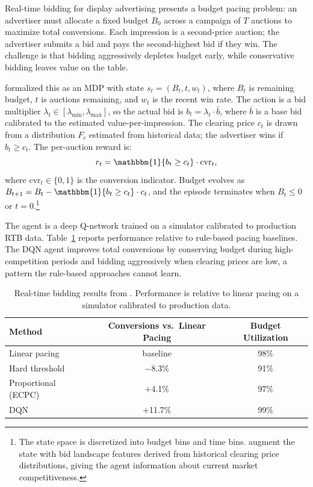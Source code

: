 Real-time bidding for display advertising presents a budget pacing problem: an advertiser must allocate a fixed budget $B_0$ across a campaign of $T$ auctions to maximize total conversions. Each impression is a second-price auction; the advertiser submits a bid and pays the second-highest bid if they win. The challenge is that bidding aggressively depletes budget early, while conservative bidding leaves value on the table.

\citet{Wu2018rtb} formalized this as an MDP with state $s_t = (B_t, t, w_t)$, where $B_t$ is remaining budget, $t$ is auctions remaining, and $w_t$ is the recent win rate. The action is a bid multiplier $\lambda_t \in [\lambda_{\min}, \lambda_{\max}]$, so the actual bid is $b_t = \lambda_t \cdot \bar{b}$, where $\bar{b}$ is a base bid calibrated to the estimated value-per-impression. The clearing price $c_t$ is drawn from a distribution $F_c$ estimated from historical data; the advertiser wins if $b_t \geq c_t$. The per-auction reward is:
\begin{equation}
r_t = \mathbbm{1}\{b_t \geq c_t\} \cdot \mathrm{cvr}_t,
\end{equation}
where $\mathrm{cvr}_t \in \{0,1\}$ is the conversion indicator. Budget evolves as $B_{t+1} = B_t - \mathbbm{1}\{b_t \geq c_t\} \cdot c_t$, and the episode terminates when $B_t \leq 0$ or $t = 0$.\footnote{The state space is discretized into budget bins and time bins. \citet{Wu2018rtb} augment the state with bid landscape features derived from historical clearing price distributions, giving the agent information about current market competitiveness.}

The agent is a deep Q-network trained on a simulator calibrated to production RTB data. Table~\ref{tab:rtb_results} reports performance relative to rule-based pacing baselines. The DQN agent improves total conversions by conserving budget during high-competition periods and bidding aggressively when clearing prices are low, a pattern the rule-based approaches cannot learn.

\begin{table}[htbp]
\centering
\caption{Real-time bidding results from \citet{Wu2018rtb}. Performance is relative to linear pacing on a simulator calibrated to production data.}
\label{tab:rtb_results}
\begin{tabular}{lcc}
\toprule
Method & Conversions vs.\ Linear Pacing & Budget Utilization \\
\midrule
Linear pacing & baseline & 98\% \\
Hard threshold & $-$8.3\% & 91\% \\
Proportional (ECPC) & $+$4.1\% & 97\% \\
DQN \citep{Wu2018rtb} & $+$11.7\% & 99\% \\
\bottomrule
\end{tabular}
\end{table}


